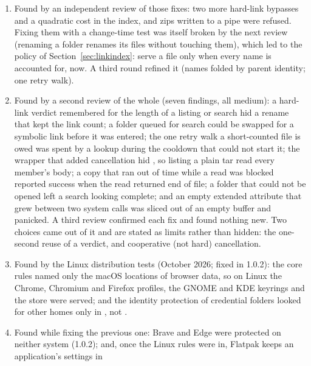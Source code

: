 \begin{enumerate}
        boundary looked complete; an old search's timer overwrote a new search's results; resize-handle
        keys also moved the selection; and a collator that compares digits by value left
         and  in an order that depended on the input.
  \item Found by an independent review of those fixes: two more hard-link bypasses and a quadratic
        cost in the index, and zips written to a pipe were refused.  Fixing them with a change-time test
        was itself broken by the next review (renaming a folder renames its files without touching
        them), which led to the policy of Section~\ref{sec:linkindex}: serve a file only when every name
        is accounted for, now.  A third round refined it (names folded by parent identity; one
        retry walk).
  \item Found by a second review of the whole (seven findings, all medium): a hard-link verdict
        remembered for the length of a listing or search hid a rename that kept the link count; a
        folder queued for search could be swapped for a symbolic link before it was entered; the
        one retry walk a short-counted file is owed was spent by a lookup during the cooldown that
        could not start it; the wrapper that added cancellation hid , so listing a plain
        tar read every member's body; a copy that ran out of time while a read was blocked reported
        success when the read returned end of file; a folder that could not be opened left a search
        looking complete; and an empty extended attribute that grew between two system calls was
        sliced out of an empty buffer and panicked.  A third review confirmed each fix and found
        nothing new.  Two choices came out of it and are stated as limits rather than hidden: the
        one-second reuse of a verdict, and cooperative (not hard) cancellation.
  \item Found by the Linux distribution tests (October 2026; fixed in 1.0.2): the core rules
        named only the macOS locations of browser data, so on Linux the Chrome, Chromium and
        Firefox profiles, the GNOME and KDE keyrings and the  store were served; and
        the identity protection of credential folders looked for other homes only in
        , not .
  \item Found while fixing the previous one: Brave and Edge were protected on neither system
        (1.0.2); and, once the Linux rules were in, Flatpak keeps an application's settings in

\end{enumerate}
